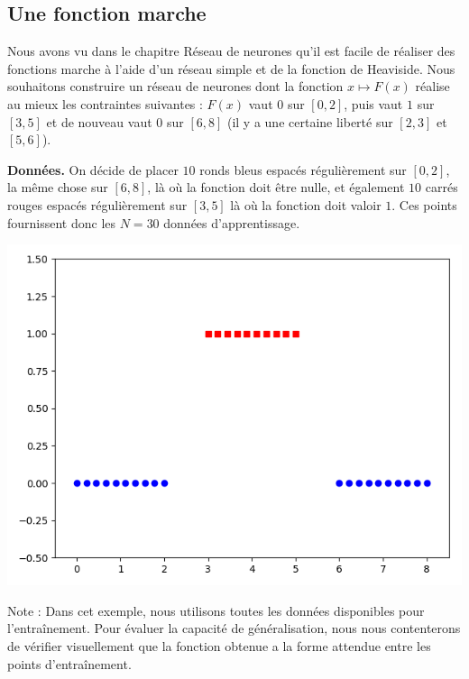 \subsection{Une fonction marche}

Nous avons vu dans le chapitre  \og{}Réseau de neurones\fg{} qu'il est facile de réaliser des fonctions \og{}marche\fg{} à l'aide d'un réseau simple et de la fonction de Heaviside.
Nous souhaitons construire un réseau de neurones dont la fonction $x \mapsto F(x)$ réalise au mieux les contraintes suivantes : $F(x)$ vaut $0$ sur $[0,2]$, puis vaut $1$ sur $[3,5]$ et de nouveau vaut
$0$ sur $[6,8]$ (il y a une certaine liberté sur $[2,3]$ et $[5,6]$).


\bigskip

\textbf{Données.}
On décide de placer $10$ ronds bleus espacés régulièrement sur $[0,2]$, la même chose sur 
$[6,8]$, là où la fonction doit être nulle, et également $10$ carrés rouges espacés régulièrement sur $[3,5]$ là où la fonction doit valoir $1$. Ces points fournissent donc les $N=30$ données d'apprentissage. 

\begin{center}
	\includegraphics[scale=\myscale,scale=0.4]{figures/retro_03_a}
\end{center}

Note : Dans cet exemple, nous utilisons toutes les données disponibles pour l'entraînement. Pour évaluer la capacité de généralisation, nous nous contenterons de vérifier visuellement que la fonction obtenue a la forme attendue entre les points d'entraînement.

